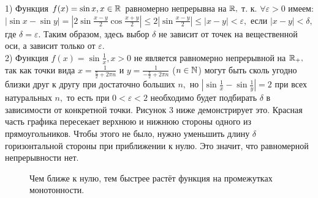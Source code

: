 \begin{example}
    1) Функция $f(x)=\sin x, x \in \mathbb{R}$
    равномерно непрерывна на $\mathbb{R},$ т. к.
    $\forall \varepsilon>0$
    имеем: $|\sin x-\sin y|=
        |2\sin\frac{x-y}{2}\cos\frac{x+y}{2}|
        \leq2|\sin\frac{x-y}{2}|\leq|x-y|<\varepsilon,$
    если $|x-y|<\delta,$ где $\delta=
        \varepsilon.$ Таким образом, здесь выбор
    $\delta$ не зависит от точек на вещественной
    оси, а зависит только от $\varepsilon.$\\
    2) Функция $f(x)=\sin\frac{1}{x}, x > 0$
    не является равномерно непрерывной на $\mathbb{R}_+,$
    так как точки вида $x=\frac{1}{\frac{\pi}{2}+
            2\pi n}$ и $y=\frac{1}{-\frac{\pi}{2}+2\pi n}$
    ($n \in \mathbb{N}$) могут быть сколь угодно близки
    друг к другу при достаточно больших $n,$
    но $|\sin\frac{1}{x}-\sin\frac{1}{y}|=2$
    при всех натуральных $n,$ то есть при
    $0<\varepsilon<2$ необходимо будет подбирать
    $\delta$ в зависимости от конкретной точки.
    Рисунок 3 ниже демонстрирует это.
    Красная часть графика пересекает верхнюю
    и нижнюю стороны одного из
    прямоугольников. Чтобы этого не было,
    нужно уменьшить длину $\delta$ горизонтальной
    стороны при приближении к нулю. Это значит,
    что равномерной непрерывности нет.\begin{figure}[h!]
        \caption{Чем ближе к нулю, тем быстрее растёт функция на промежутках монотонности.}
        \label{fig:image}
    \end{figure}
\end{example}

